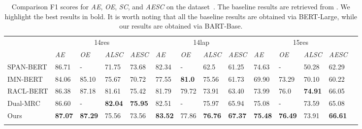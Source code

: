 \documentclass[11pt,a4paper]{article}
\begin{document}
\begin{table*}[h]
  \centering\small
  \setlength{\tabcolsep}{0.75pt}
  \renewcommand{\arraystretch}{1.3}
  \begin{tabular}{m{2.5cm}m{1.065cm}<{\centering}m{1.065cm}<{\centering}m{1.065cm}<{\centering}m{1.065cm}<{\centering}|m{1.065cm}<{\centering}m{1.065cm}<{\centering}m{1.065cm}<{\centering}m{1.065cm}<{\centering}|m{1.065cm}<{\centering}m{1.065cm}<{\centering}m{1.065cm}<{\centering}m{1.065cm}<{\centering}m{1.065cm}<{\centering}}
    \Xhline{0.08em}
  \multirow{2}{*}{Model} & \multicolumn{4}{c|}{14res}                                        & \multicolumn{4}{c|}{14lap}                                      & \multicolumn{4}{c}{15res}                                        \\
    \cline{2-13}
    & \emph{AE}            & \emph{OE}             & \emph{ALSC}             & \emph{AESC}            & \emph{AE}             & \emph{OE}          & \emph{ALSC}             & \emph{AESC}            & \emph{AE}             & \emph{OE}             & \emph{ALSC}             & \emph{AESC}           \\
    \cline{1-13}
    SPAN-BERT              & 86.71         & -              & 71.75          & 73.68          & 82.34          & -           & 62.5           & 61.25          & 74.63          & -              & 50.28          & 62.29         \\
  IMN-BERT               & 84.06         & 85.10          & 75.67          & 70.72          & 77.55          & \textbf{81.0} & 75.56          & 61.73          & 69.90          & 73.29          & 70.10          & 60.22         \\
  RACL-BERT              & 86.38         & 87.18          & 81.61          & 75.42          & 81.79          & 79.72       & 73.91          & 63.40          & 73.99          & 76.0           & \textbf{74.91} & 66.05         \\
  Dual-MRC               & 86.60         & -              & \textbf{82.04} & \textbf{75.95} & 82.51          & -           & 75.97          & 65.94          & 75.08          & -              & 73.59          & 65.08         \\
    \Xhline{0.05em}
    Ours                   & \textbf{87.07} & \textbf{87.29} & 75.56          & 73.56          & \textbf{83.52} & 77.86       & \textbf{76.76} & \textbf{67.37} & \textbf{75.48} & \textbf{76.49} & 73.91          & \textbf{66.61} \\
    \Xhline{0.08em}
  \end{tabular}
  \caption{Comparison F1 scores for  \emph{AE}, \emph{OE}, \emph{SC}, and \emph{AESC}   on the   dataset~\citep{DBLP:conf/aaai/WangPDX17}. The baseline results are retrieved from \citet{DBLP:journals/corr/abs-2101-00816}. We highlight the best results in bold. It is worth noting that all the baseline results are obtained via BERT-Large, while our results are obtained via BART-Base.}
  \label{tb:wang}
  \end{table*}
\end{document}
